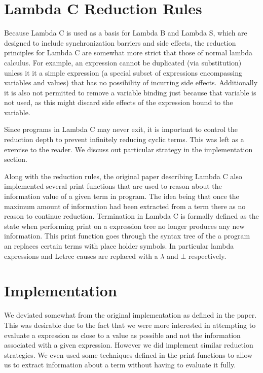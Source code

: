 \documentclass[preprint, 10pt]{sigplanconf}
\begin{document}
\section{Lambda C Reduction Rules}
Because Lambda C is used as a basis for Lambda B and Lambda S, which are designed to include synchronization barriers and side effects, the reduction principles for Lambda C are somewhat more strict that those of normal lambda calculus.  For example, an expression cannot be duplicated (via substitution) unless it it a simple expression (a special subset of expressions encompassing variables and values)  that has no possibility of incurring side effects.  Additionally it is also not permitted to remove a variable binding just because that variable is not used, as this might discard side effects of the expression bound to the variable.

Since programs in Lambda C may never exit, it is important to control the reduction depth to prevent infinitely reducing cyclic terms. This was left as a exercise to the reader. We discuss out particular strategy in the implementation section.

Along with the reduction rules, the original paper describing Lambda C also implemented several print functions that are used to reason about the information value of a given term in program. The idea being that once the maximum amount of information had been extracted from a term there as no reason to continue reduction. Termination in Lambda C is formally defined as the state when performing print on a expression tree no longer produces any new information.  This print function goes through the syntax tree of the a program an replaces certain terms with place holder symbols. In particular lambda expressions and Letrec causes are replaced with a $\lambda$ and $\bot$ respectively.

\section{Implementation}
We deviated somewhat from the original implementation as defined in the paper. This was desirable due to the fact that we were more interested in attempting to evaluate a expression as close to a value as possible and not the information associated with a given expression. However we did implement similar reduction strategies. We even used some techniques defined in the print functions to allow us to extract information about a term without having to evaluate it fully. 
\end{document}
